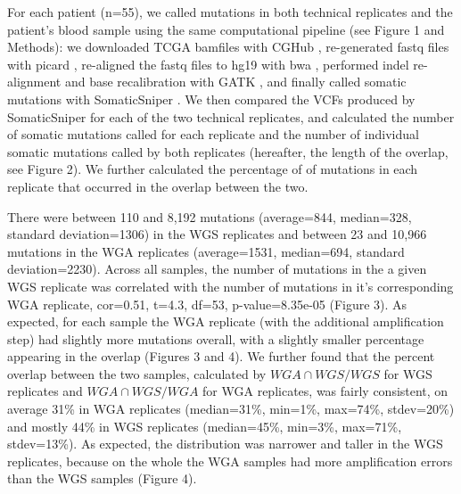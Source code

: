 \documentclass[11pt]{article} %
\begin{document}
For each patient (n=55), we called mutations in both technical replicates and the patient's blood sample using the same computational pipeline (see Figure 1 and Methods): we downloaded TCGA bamfiles with CGHub \citep{CGHub}, re-generated fastq files with picard \citep{picard}, re-aligned the fastq files to hg19 with bwa \citep{bwa}, performed indel re-alignment and base recalibration with GATK \citep{GATK}, and finally called somatic mutations with SomaticSniper \citep{SomaticSniper}. We then compared the VCFs produced by SomaticSniper for each of the two technical replicates, and calculated the number of somatic mutations called for each replicate and the number of individual somatic mutations called by both replicates (hereafter, the length of the overlap, see Figure 2). We further calculated the percentage of of mutations in each replicate that occurred in the overlap between the two. 

There were between 110 and 8,192 mutations (average=844, median=328, standard deviation=1306) in the WGS replicates and between 23 and 10,966 mutations in the WGA replicates (average=1531, median=694, standard deviation=2230). Across all samples, the number of mutations in the a given WGS replicate was correlated with the number of mutations in it's corresponding WGA replicate, cor=0.51, t=4.3, df=53, p-value=8.35e-05 (Figure 3). As expected, for each sample the WGA replicate (with the additional amplification step) had slightly more mutations overall, with a slightly smaller percentage appearing in the overlap (Figures 3 and 4). We further found that the percent overlap between the two samples, calculated by $WGA \cap WGS/WGS$ for WGS replicates and $WGA \cap WGS/WGA$ for WGA replicates, was fairly consistent, on average 31\% in WGA replicates (median=31\%, min=1\%, max=74\%, stdev=20\%) and mostly 44\% in WGS replicates (median=45\%, min=3\%, max=71\%, stdev=13\%). As expected, the distribution was narrower and taller in the WGS replicates, because on the whole the WGA samples had more amplification errors than the WGS samples (Figure 4).
\end{document}
